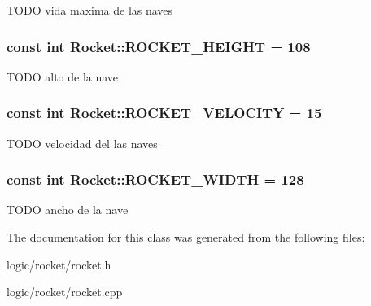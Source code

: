 T\-O\-D\-O vida maxima de las naves \hypertarget{class_rocket_a5096c34316cb2b6116b3971f0cbb56f2}{
\subsubsection[{R\-O\-C\-K\-E\-T\-\_\-\-H\-E\-I\-G\-H\-T}]{\setlength{\rightskip}{0pt plus 5cm}const int Rocket\-::\-R\-O\-C\-K\-E\-T\-\_\-\-H\-E\-I\-G\-H\-T = 108\hspace{0.3cm}{\ttfamily [static]}}}\label{class_rocket_a5096c34316cb2b6116b3971f0cbb56f2}
T\-O\-D\-O alto de la nave \hypertarget{class_rocket_a1a590b76e2cc310e566f2624265f5c47}{
\subsubsection[{R\-O\-C\-K\-E\-T\-\_\-\-V\-E\-L\-O\-C\-I\-T\-Y}]{\setlength{\rightskip}{0pt plus 5cm}const int Rocket\-::\-R\-O\-C\-K\-E\-T\-\_\-\-V\-E\-L\-O\-C\-I\-T\-Y = 15\hspace{0.3cm}{\ttfamily [static]}}}\label{class_rocket_a1a590b76e2cc310e566f2624265f5c47}
T\-O\-D\-O velocidad del las naves \hypertarget{class_rocket_ac8b2266f7e3aa777aca1b0144722a0db}{
\subsubsection[{R\-O\-C\-K\-E\-T\-\_\-\-W\-I\-D\-T\-H}]{\setlength{\rightskip}{0pt plus 5cm}const int Rocket\-::\-R\-O\-C\-K\-E\-T\-\_\-\-W\-I\-D\-T\-H = 128\hspace{0.3cm}{\ttfamily [static]}}}\label{class_rocket_ac8b2266f7e3aa777aca1b0144722a0db}
T\-O\-D\-O ancho de la nave 

The documentation for this class was generated from the following files\-:\begin{DoxyCompactItemize}
\item 
logic/rocket/rocket.\-h\item 
logic/rocket/rocket.\-cpp\end{DoxyCompactItemize}
